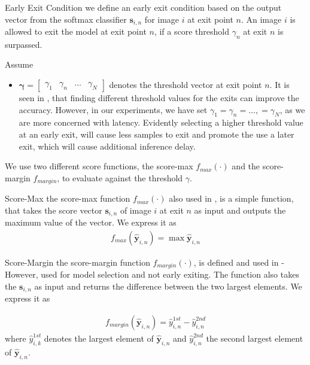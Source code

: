 \begin{enumdescript}
		\item[Early Exit Condition] we define an early exit condition based on the output vector from the softmax classifier $ \bm{s}_{i,n} $ for image $ i $ at exit point $ n $. An image $ i $ is allowed to exit the model at exit point $ n $, if a score threshold $ \gamma_n $ at exit $ n $ is surpassed.
		
		Assume
		\begin{itemize}
			\item $ \bm{\gamma} = \left[\begin{array}{cccc}
			\gamma_{1} & \gamma_{n} & \dots & \gamma_{N} \end{array}\right]  $ denotes the threshold vector at exit point $ n $. It is seen in \cite{teerapittayanon_finding_2018}, that finding different threshold values for the exits can improve the accuracy. However, in our experiments, we have set $ \gamma_{1} = \gamma_{n} = \dots, = \gamma_{N}  $, as we are more concerned with latency. Evidently selecting a higher threshold value at an early exit, will cause less samples to exit and promote the use a later exit, which will cause additional inference delay.
		\end{itemize}
		
		We use two different score functions, the score-max $ f_{max}(\cdot) $ and the score-margin $ f_{margin} $, to evaluate against the threshold $ \gamma $. 
		
		\begin{enumdescript}
			
			
			\item[Score-Max] the score-max function $ f_{max}(\cdot)$ also used in \cite{leroux_resource-constrained_2015}, is a simple function, that takes the score vector $ \bm{s}_{i,n} $ of image $ i $ at exit $ n $ as input and outputs the maximum value of the vector. We express it as 
			\begin{align}
			f_{max}\left(\bm{\hat{y}}_{i,n}\right) = \max \bm{\hat{y}}_{i,n}
			\end{align}
			
			
			\item[Score-Margin] the score-margin function $ f_{margin}(\cdot)$, is defined and used in \cite{park_big/little_2015}- However, used for model selection and not early exiting. The function also takes the $ \bm{s}_{i,n} $ as input and returns the difference between the two largest elements. We express it as
			
			\begin{align}
			f_{margin}\left(\bm{\hat{y}}_{i,n}\right) = \hat{y}_{i,n}^{1st} - \hat{y}_{i,n}^{2nd}
			\end{align}
			where $ \hat{y}_{i,k}^{1st} $ denotes the largest element of $ \bm{\hat{y}}_{i,n} $ 
			and $ \hat{y}_{i,n}^{2nd} $ the second largest element of $ \bm{\hat{y}}_{i,n} $.
			

\end{enumdescript}
\end{enumdescript}
